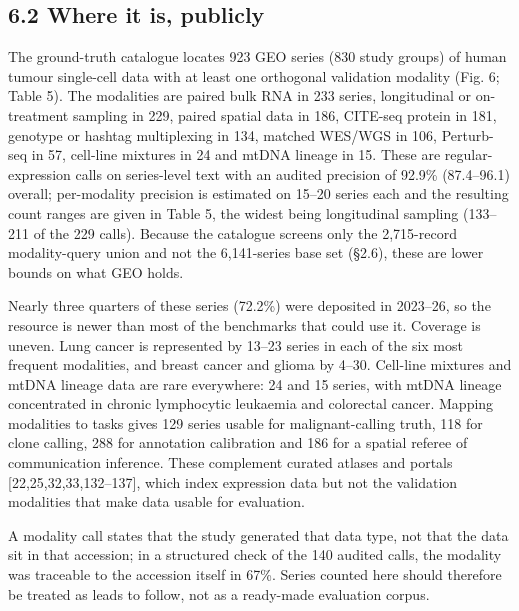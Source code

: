\documentclass[11pt]{article}
\begin{document}
\subsection{6.2 Where it is, publicly}\label{where-it-is-publicly}

The ground-truth catalogue locates 923 GEO series (830 study groups) of
human tumour single-cell data with at least one orthogonal validation
modality (Fig. 6; Table 5). The modalities are paired bulk RNA in 233
series, longitudinal or on-treatment sampling in 229, paired spatial
data in 186, CITE-seq protein in 181, genotype or hashtag multiplexing
in 134, matched WES/WGS in 106, Perturb-seq in 57, cell-line mixtures in
24 and mtDNA lineage in 15. These are regular-expression calls on
series-level text with an audited precision of 92.9\% (87.4--96.1)
overall; per-modality precision is estimated on 15--20 series each and
the resulting count ranges are given in Table 5, the widest being
longitudinal sampling (133--211 of the 229 calls). Because the catalogue
screens only the 2,715-record modality-query union and not the
6,141-series base set (§2.6), these are lower bounds on what GEO holds.

Nearly three quarters of these series (72.2\%) were deposited in
2023--26, so the resource is newer than most of the benchmarks that
could use it. Coverage is uneven. Lung cancer is represented by 13--23
series in each of the six most frequent modalities, and breast cancer
and glioma by 4--30. Cell-line mixtures and mtDNA lineage data are rare
everywhere: 24 and 15 series, with mtDNA lineage concentrated in chronic
lymphocytic leukaemia and colorectal cancer. Mapping modalities to tasks
gives 129 series usable for malignant-calling truth, 118 for clone
calling, 288 for annotation calibration and 186 for a spatial referee of
communication inference. These complement curated atlases and portals
{[}22,25,32,33,132--137{]}, which index expression data but not the
validation modalities that make data usable for evaluation.

A modality call states that the study generated that data type, not that
the data sit in that accession; in a structured check of the 140 audited
calls, the modality was traceable to the accession itself in 67\%.
Series counted here should therefore be treated as leads to follow, not
as a ready-made evaluation corpus.
\end{document}
